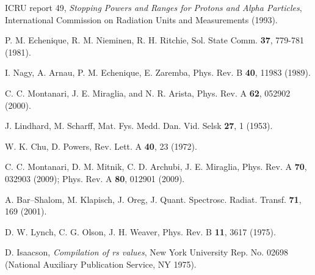 \begin{thebibliography}{9}
ICRU report 49, \textit{Stopping Powers and Ranges for Protons and Alpha Particles},
International Commission on Radiation Units and Measurements (1993).

P. M. Echenique, R. M. Nieminen, R. H. Ritchie, 
Sol. State Comm. \textbf{37}, 779-781 (1981).

I. Nagy, A. Arnau, P. M. Echenique, E. Zaremba, 
Phys. Rev. B \textbf{40}, 11983 (1989).

C. C. Montanari, J. E. Miraglia, and N. R. Arista, 
Phys. Rev. A \textbf{62}, 052902 (2000).

J. Lindhard, M. Scharff,  
Mat. Fys. Medd. Dan. Vid. Selsk  \textbf{27}, 1 (1953).

W. K. Chu, D. Powers, 
Rev. Lett. A \textbf{40}, 23 (1972).

C. C. Montanari, D. M. Mitnik, C. D. Archubi, J. E. Miraglia, 
Phys. Rev. A \textbf{70}, 032903 (2009); 
Phys. Rev. A \textbf{80}, 012901 (2009).

\begin{comment}

\bibitem{Montanari:09}
C. C. Montanari, C. D. Archubi, D. M. Mitnik, J. E. Miraglia,
Phys. Rev. A \textbf{79}, 032903 (2009);

\bibitem{Montanari:11}
C.C. Montanari, D. M. Mitnik, J. E. Miraglia,
Rad. Eff. Defects Sol. \textbf{166}, 338 (2011).

\bibitem{Oswald:18}
M. Oswal, Sunil Kumar, Udai Singh, G. Singhe, K. P. Singh, D. Mehta,
D. Mitnik, C. C. Montanari, T.Nandi,
Nucl. Instr. Meth. Phys.
Res. B \textbf{416}, 110 (2018).

\bibitem{Montanari:19}
A. M. P. Mendez, C. C. Montanari, D. M. Mitnik, J. E. Miraglia,
\textit{en preparación}.

\end{comment}


A. Bar--Shalom, M. Klapisch, J. Oreg,
J. Quant. Spectrosc. Radiat. Transf. \textbf{71}, 169 (2001).

D. W. Lynch, C. G. Olson, J. H. Weaver,
Phys. Rev. B \textbf{11}, 3617 (1975).

D. Isaacson,
\textit{Compilation of rs values}, New York University Rep. No. 02698
(National Auxiliary Publication Service, NY 1975).



\end{thebibliography}
